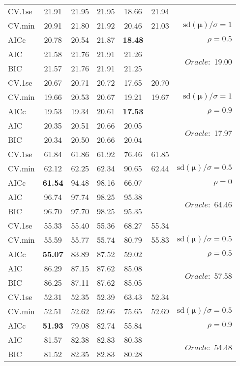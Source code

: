 \begin{table}
\begin{center}
\begin{tabular}{l*{5}{c}|r}
 \hline 
CV.1se & 21.91 & 21.95 & 21.95 & 18.66 & 21.94 & \\
CV.min & 20.91 & 21.80 & 21.92 & 20.46 & 21.03 &  $\mathrm{sd}(\mathbf{\mu})/\sigma=1$ \\
AICc & 20.78 & 20.54 & 21.87 & {\bf 18.48} & & $\rho=0.5$ \\
AIC & 21.58 & 21.76 & 21.91 & 21.26 & &  \multirow{2}{*}{$Oracle: $ 19.00} \\
BIC & 21.57 & 21.76 & 21.91 & 21.25 & &  \\
 \hline 
CV.1se & 20.67 & 20.71 & 20.72 & 17.65 & 20.70 & \\
CV.min & 19.66 & 20.53 & 20.67 & 19.21 & 19.67 &  $\mathrm{sd}(\mathbf{\mu})/\sigma=1$ \\
AICc & 19.53 & 19.34 & 20.61 & {\bf 17.53} & & $\rho=0.9$ \\
AIC & 20.35 & 20.51 & 20.66 & 20.05 & &  \multirow{2}{*}{$Oracle: $ 17.97} \\
BIC & 20.34 & 20.50 & 20.66 & 20.04 & &  \\
 \hline 
CV.1se & 61.84 & 61.86 & 61.92 & 76.46 & 61.85 & \\
CV.min & 62.12 & 62.25 & 62.34 & 90.65 & 62.44 &  $\mathrm{sd}(\mathbf{\mu})/\sigma=0.5$ \\
AICc & {\bf 61.54} & 94.48 & 98.16 & 66.07 & & $\rho=0$ \\
AIC & 96.74 & 97.74 & 98.25 & 95.38 & &  \multirow{2}{*}{$Oracle: $ 64.46} \\
BIC & 96.70 & 97.70 & 98.25 & 95.35 & &  \\
 \hline 
CV.1se & 55.33 & 55.40 & 55.36 & 68.27 & 55.34 & \\
CV.min & 55.59 & 55.77 & 55.74 & 80.79 & 55.83 &  $\mathrm{sd}(\mathbf{\mu})/\sigma=0.5$ \\
AICc & {\bf 55.07} & 83.89 & 87.52 & 59.02 & & $\rho=0.5$ \\
AIC & 86.29 & 87.15 & 87.62 & 85.08 & &  \multirow{2}{*}{$Oracle: $ 57.58} \\
BIC & 86.25 & 87.11 & 87.62 & 85.05 & &  \\
 \hline 
CV.1se & 52.31 & 52.35 & 52.39 & 63.43 & 52.34 & \\
CV.min & 52.51 & 52.62 & 52.66 & 75.65 & 52.69 &  $\mathrm{sd}(\mathbf{\mu})/\sigma=0.5$ \\
AICc & {\bf 51.93} & 79.08 & 82.74 & 55.84 & & $\rho=0.9$ \\
AIC & 81.57 & 82.38 & 82.83 & 80.38 & &  \multirow{2}{*}{$Oracle: $ 54.48} \\
BIC & 81.52 & 82.35 & 82.83 & 80.28 & &  \\
 \hline 
\end{tabular}
\end{center}
\vspace{-1cm}
\end{table}





